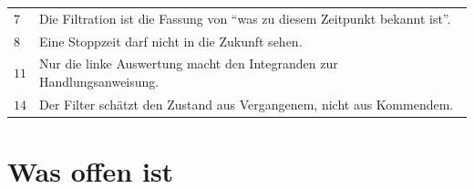 \begin{merksatz}
\begin{center}
{\small
\renewcommand{\arraystretch}{1.48}
\begin{tabular}{@{}P{1.4cm}P{7.0cm}@{}}
\toprule
$7$ & Die Filtration ist die Fassung von \enquote{was zu diesem Zeitpunkt bekannt ist}.\\
$8$ & Eine Stoppzeit darf nicht in die Zukunft sehen.\\
$11$ & Nur die linke Auswertung macht den Integranden zur Handlungsanweisung.\\
$14$ & Der Filter schätzt den Zustand aus Vergangenem, nicht aus Kommendem.\\
\bottomrule
\end{tabular}}
\end{center}

\begin{center}
\begin{minipage}{0.88\textwidth}
\end{minipage}
\end{center}
\end{merksatz}

\section{Was offen ist}

